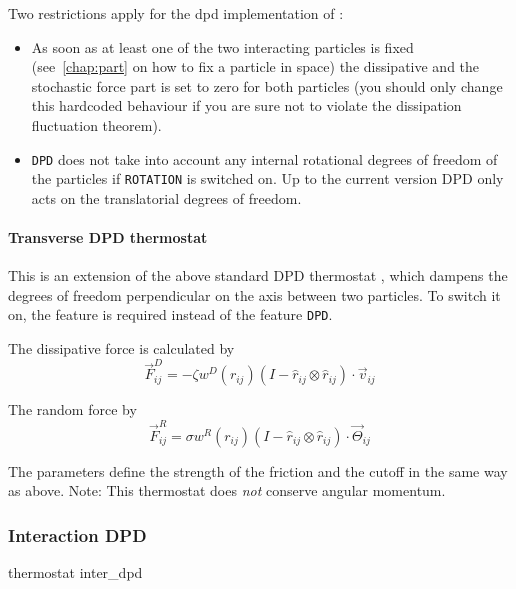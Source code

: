 Two restrictions apply for the dpd implementation of \es:

\begin{itemize}
\item As soon as at least one of the two interacting particles is
  fixed (see~\ref{chap:part} on how to fix a particle in space) the
  dissipative and the stochastic force part is set to zero for both
  particles (you should only change this hardcoded behaviour if you
  are sure not to violate the dissipation fluctuation theorem).
\item \texttt{DPD} does not take into account any internal rotational
  degrees of freedom of the particles if \texttt{ROTATION} is switched
  on. Up to the current version DPD only acts on the translatorial
  degrees of freedom.
\end{itemize}

\paragraph{Transverse DPD thermostat}\label{sec:transDPD}
This is an extension of the above standard DPD thermostat
\cite{junghans2008}, which dampens the degrees of freedom
perpendicular on the axis between two particles. To switch it on, the
feature  is required instead of the feature
\texttt{DPD}.

The dissipative force is calculated by
\begin{equation}
  \vec{F}_{ij}^{D} = -\zeta w^D (r_{ij}) (I-\hat{r}_{ij}\otimes\hat{r}_{ij}) \cdot \vec{v}_{ij}
\end{equation}

The random force by
\begin{equation}
  \vec{F}_{ij}^R = \sigma w^R (r_{ij}) (I-\hat{r}_{ij}\otimes\hat{r}_{ij}) \cdot \vec{\Theta}_{ij}
\end{equation}

The parameters   define the strength of the
friction and the cutoff in the same way as above.  Note: This
thermostat does \emph{not} conserve angular momentum.

\subsubsection{Interaction DPD}\label{sec:interDPD}

\begin{essyntax}
  thermostat inter_dpd 
  \begin{features}
  \end{features}
\end{essyntax}


